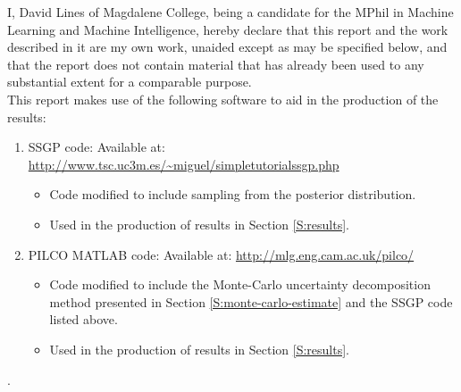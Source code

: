 
\begin{declaration}

I, David Lines of Magdalene College, being a candidate for the MPhil in Machine Learning and Machine Intelligence, hereby declare that this report and the work described in it are my own work, unaided except as may be specified below, and that the report does not contain material that has already been used to any substantial extent for a comparable purpose.
\\[0.5in]
This report makes use of the following software to aid in the production of the results:
\begin{enumerate}
   \item SSGP code: Available at: \url{http://www.tsc.uc3m.es/~miguel/simpletutorialssgp.php}
   \begin{itemize}
     \item Code modified to include sampling from the posterior distribution. 
     \item Used in the production of results in Section \ref{S:results}.
   \end{itemize}
   \item PILCO MATLAB code: Available at: \url{http://mlg.eng.cam.ac.uk/pilco/}
   \begin{itemize}
     \item Code modified to include the Monte-Carlo uncertainty decomposition method presented in Section \ref{S:monte-carlo-estimate} and the SSGP code listed above.
     \item Used in the production of results in Section \ref{S:results}.
   \end{itemize}
\end{enumerate}
.
\end{declaration}

